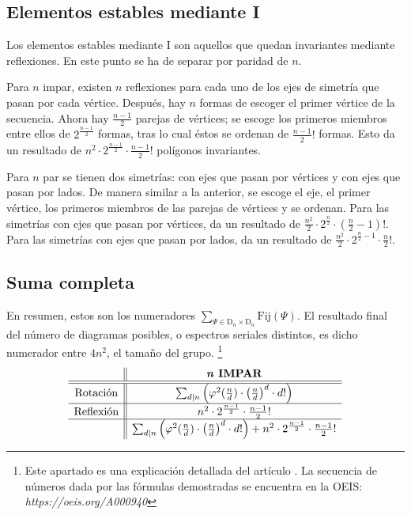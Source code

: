 		\subsection{Elementos estables mediante I}
		
		Los elementos estables mediante I son aquellos que quedan invariantes mediante reflexiones. En este punto se ha de separar por paridad de $n$. 
		
		Para $n$ impar, existen $n$ reflexiones para cada uno de los ejes de simetría que pasan por cada vértice. Después, hay $n$ formas de escoger el primer vértice de la secuencia. Ahora hay $\frac{n-1}{2}$ parejas de vértices; se escoge los primeros miembros entre ellos de $2^{\frac{n-1}{2}}$ formas, tras lo cual éstos se ordenan de $\frac{n-1}{2}!$ formas. Esto da un resultado de  $n^2\cdot2^{\frac{n-1}{2}}\cdot\frac{n-1}{2}!$ polígonos invariantes.
		
		Para $n$ par se tienen dos simetrías: con ejes que pasan por vértices y con ejes que pasan por lados. De manera similar a la anterior, se escoge el eje, el primer vértice, los primeros miembros de las parejas de vértices y se ordenan. Para las simetrías con ejes que pasan por vértices, da un resultado de  $\frac{n^2}{2}\cdot2^{\frac{n}{2}}\cdot\left(\frac{n}{2}-1\right)!$. Para las simetrías con ejes que pasan por lados, da un resultado de $\frac{n^2}{2}\cdot2^{\frac{n}{2}-1}\cdot\frac{n}{2}!$.
		
		\subsection*{Suma completa}
		
		En resumen, estos son los numeradores $\sum_{\Psi\in\text{D}_{n}\times\text{D}_{n}}\text{Fij}(\Psi)$. El resultado final del número de diagramas posibles, o espectros seriales distintos, es dicho numerador entre $4n^2$, el tamaño del grupo. \footnote{Este apartado es una explicación detallada del artículo \cite{polygons}. La secuencia de números dada por las fórmulas demostradas se encuentra en la OEIS: \textit{https://oeis.org/A000940}}		
		\def\arraystretch{1.25}
		\[\begin{array}{c||c}
		&\textbf{\textit{n} IMPAR}\\\hline\hline
		\text{Rotación}&\sum_{d|n}\left(\varphi^2(\frac{n}{d})\cdot\left(\frac{n}{d}\right)^d\cdot d!\right)\\\hline
		\text{Reflexión}&n^2\cdot2^{\frac{n-1}{2}}\cdot\frac{n-1}{2}!\\\hline
		&\sum_{d|n}\left(\varphi^2(\frac{n}{d})\cdot\left(\frac{n}{d}\right)^d\cdot d!\right)+n^2\cdot2^{\frac{n-1}{2}}\cdot\frac{n-1}{2}!\\
		\end{array}\]
		
